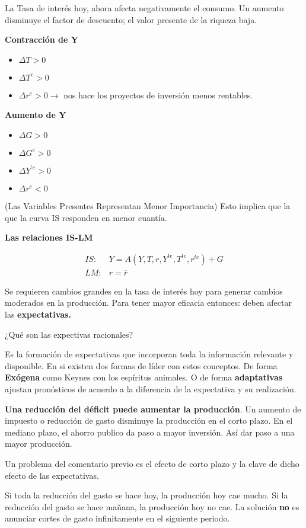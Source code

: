 La Tasa de interés hoy, ahora afecta negativamente el consumo. Un aumento disminuye el factor de descuento; el valor presente de la riqueza baja. 

\textbf{Contracción de Y}
\begin{itemize}
    \item $\Delta T >0$
    \item $\Delta T^{e} >0$
    \item $\Delta r^{e} >0 \to$ nos hace los proyectos de inversión menos rentables.
\end{itemize}

\textbf{Aumento de Y}
\begin{itemize}
    \item $\Delta G >0$
    \item $\Delta G^{e} >0$
    \item $\Delta Y^{'e} >0$
    \item $\Delta r^{e} <0$
\end{itemize}
\begin{remark}(Las Variables Presentes Representan Menor Importancia)
 Esto implica que la que la curva IS responden en menor cuantía.
\end{remark}

\textbf{Las relaciones IS-LM}

\begin{align}
    IS: & Y= A(Y,T,r,Y^{te},T^{te},r^{te}) +G\\ 
    LM: & r = \overline{r}
\end{align}

Se requieren cambios grandes en la tasa de interés hoy para generar cambios moderados en la producción. Para tener mayor eficacia entonces: deben afectar las \textbf{expectativas.} 

¿Qué son las expectivas racionales? 

Es la formación de expectativas que incorporan toda la información relevante y disponible. En si existen dos formas de líder con estos conceptos. De forma \textbf{Exógena} como Keynes con los espíritus animales. O de forma \textbf{adaptativas} ajustan pronósticos de acuerdo a la diferencia de la expectativa y su realización.

\begin{remark}
 \textbf{Una reducción del déficit puede aumentar la producción}. Un aumento de impuesto o reducción de gasto disminuye la producción en el corto plazo. En el mediano plazo, el ahorro publico da paso a mayor inversión. Así dar paso a una mayor producción. 
 
 Un problema del comentario previo es el efecto de corto plazo y la clave de dicho efecto de las expectativas.
 
 Si toda la reducción del gasto se hace hoy, la producción hoy cae mucho. Si la reducción del gasto se hace mañana, la producción hoy no cae. La solución \textbf{no} es anunciar cortes de gasto infinitamente en el siguiente periodo. 
\end{remark}





